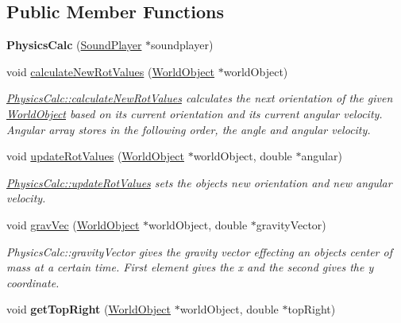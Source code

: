 \subsection*{Public Member Functions}
\begin{DoxyCompactItemize}
\item 
{\bfseries Physics\+Calc} (\hyperlink{class_sound_player}{Sound\+Player} $\ast$soundplayer)\hypertarget{class_physics_calc_a806b2675198437e8271ab82eda0e6746}{}\label{class_physics_calc_a806b2675198437e8271ab82eda0e6746}

\item 
void \hyperlink{class_physics_calc_a7ef2a6c520d3d0a815c333c1a08cb4df}{calculate\+New\+Rot\+Values} (\hyperlink{class_world_object}{World\+Object} $\ast$world\+Object)
\begin{DoxyCompactList}\small\item\em \hyperlink{class_physics_calc_a7ef2a6c520d3d0a815c333c1a08cb4df}{Physics\+Calc\+::calculate\+New\+Rot\+Values} calculates the next orientation of the given \hyperlink{class_world_object}{World\+Object} based on it\textquotesingle{}s current orientation and its current angular velocity. Angular array stores in the following order, the angle and angular velocity. \end{DoxyCompactList}\item 
void \hyperlink{class_physics_calc_afaa9837f796074797ea731066f09dfc3}{update\+Rot\+Values} (\hyperlink{class_world_object}{World\+Object} $\ast$world\+Object, double $\ast$angular)
\begin{DoxyCompactList}\small\item\em \hyperlink{class_physics_calc_afaa9837f796074797ea731066f09dfc3}{Physics\+Calc\+::update\+Rot\+Values} sets the objects new orientation and new angular velocity. \end{DoxyCompactList}\item 
void \hyperlink{class_physics_calc_ad1eaa72eeff1b031b08db33730d8decb}{grav\+Vec} (\hyperlink{class_world_object}{World\+Object} $\ast$world\+Object, double $\ast$gravity\+Vector)
\begin{DoxyCompactList}\small\item\em Physics\+Calc\+::gravity\+Vector gives the gravity vector effecting an objects center of mass at a certain time. First element gives the x and the second gives the y coordinate. \end{DoxyCompactList}\item 
void {\bfseries get\+Top\+Right} (\hyperlink{class_world_object}{World\+Object} $\ast$world\+Object, double $\ast$top\+Right)\hypertarget{class_physics_calc_af23c90f3041fe0b8be343ef2a35245d2}{}\label{class_physics_calc_af23c90f3041fe0b8be343ef2a35245d2}


\end{DoxyCompactItemize}
